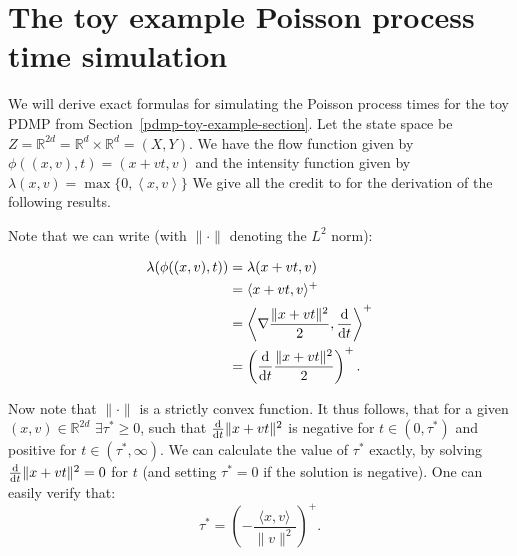 \documentclass[report.tex]{subfiles}
\begin{document}
\chapter{The toy example Poisson process time simulation}
\label{appendix-toy-example-poisson-process-jump-time-simulation}

We will derive exact formulas for simulating the Poisson process times
for the toy PDMP from Section~\ref{pdmp-toy-example-section}.
Let the state space be
$Z = \mathbb{R}^{2d} = \mathbb{R}^{d} \times \mathbb{R}^{d} = (X, Y)$.
We have the flow function given by $\phi((x,v), t) = (x + vt, v)$ and the
intensity function given by $\lambda(x, v) = \max\{0, \left\langle x, v \right\rangle\}$
We give all the credit to \citet{bouchard2015bouncy} for the derivation
of the following results.

Note that we can write (with $\lVert \cdot \rVert$ denoting the $L^{2}$ norm):

\begin{align*}
  \lambda(\phi((x, v), t))
  &= \lambda(x + vt, v) \\
  &= \langle x + vt, v \rangle^{+} \\
  &= \left\langle \nabla \frac{\lVert x + vt \rVert^{2}}{2}, \dv{}{t} (x + vt) \right\rangle^{+} \\
  &= \left( \dv{}{t} \frac{\lVert x + vt \rVert^{2}}{2} \right)^{+}.
\end{align*}

Now note that $\lVert \cdot \rVert$ is a strictly convex function. It thus follows, that
for a given $(x, v) \in \mathbb{R}^{2d}\,\, \exists \tau^{*} \geq 0$, such that
$\dv{}{t} \lVert x + vt \rVert^{2}$ is negative for $t \in (0, \tau^{*})$ and positive
for $t \in (\tau^{*}, \infty)$. We can calculate the value of $\tau^{*}$ exactly,
by solving $\dv{}{t} \lVert x + vt \rVert^{2} = 0$ for $t$ (and setting $\tau^{*} = 0$ if the solution is negative).
One can easily verify that:
\begin{equation}
  \label{tau-star-equation}
  \tau^{*} = \left( -\frac{\langle x, v \rangle}{\lVert v \rVert^{2}} \right)^{+}.
\end{equation}
\end{document}

